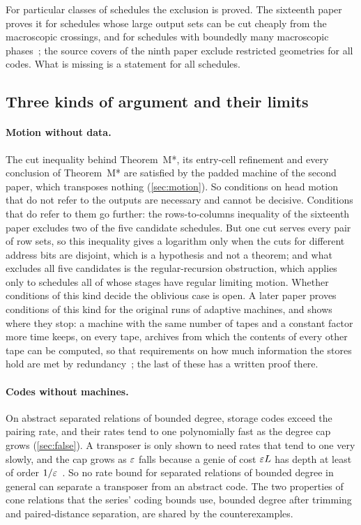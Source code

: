For particular classes of schedules the exclusion is proved. The sixteenth paper proves it for schedules whose
large output sets can be cut cheaply from the macroscopic crossings, and for schedules with boundedly many macroscopic
phases~\cite[Theorems~5.4, 9.2 and~9.3]{SixteenthPaper2026}; the source covers of the ninth paper exclude restricted
geometries for all codes. What is missing is a statement for all schedules.

\subsection{Three kinds of argument and their limits}\label{sec:exhaustions}

\paragraph{Motion without data.} The cut inequality behind Theorem~M*, its entry-cell refinement and every conclusion
of Theorem~M* are satisfied by the padded machine of the second paper, which transposes nothing (\cref{sec:motion}).
So conditions on head motion that do not refer to the outputs are necessary and cannot be decisive. Conditions that
do refer to them go further: the rows-to-columns inequality of the sixteenth paper excludes two of the five candidate
schedules. But one cut serves every pair of row sets, so this inequality gives a logarithm only when the cuts for
different address bits are disjoint, which is a hypothesis and not a theorem; and what excludes all five candidates is
the regular-recursion obstruction, which applies only to schedules all of whose stages have regular limiting motion.
Whether conditions of this kind decide the oblivious case is open. A later paper proves conditions of this kind for
the original runs of adaptive machines, and shows where they stop: a machine with the same number of tapes and a
constant factor more time keeps, on every tape, archives from which the contents of every other tape can be computed,
so that requirements on how much information the stores hold are met by
redundancy~\cite[Theorems~4.3, 5.5 and~7.1]{AdaptiveTransfer2026}; the last of these has a written proof there.

\paragraph{Codes without machines.} On abstract separated relations of bounded degree, storage codes exceed the pairing
rate, and their rates tend to one polynomially fast as the degree cap grows (\cref{sec:false}). A transposer is only
shown to need rates that tend to one very slowly, and the cap grows as $\varepsilon$ falls because a genie of cost $\varepsilon L$
has depth at least of order $1/\varepsilon$~\cite[Proposition~4.13]{FourthPaper2026}. So no rate bound for separated relations of bounded
degree in general can separate a transposer from an abstract code. The two properties of cone relations that the
series' coding bounds use, bounded degree after trimming and paired-distance separation, are shared by the
counterexamples.

